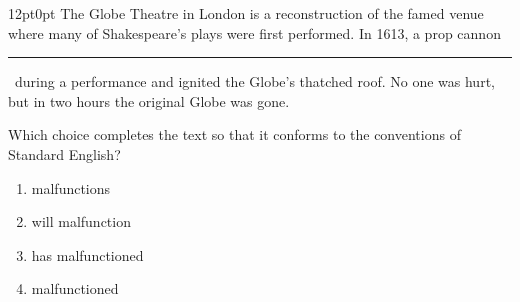 \documentclass[11pt, twocolumn]{article}
\newcounter{questionnum}
\begin{document}
\vspace{6pt}\noindent
\begin{minipage}{\columnwidth}\raggedright
\noindent{}\par\vspace{8pt}
\begin{adjustwidth}{12pt}{0pt}
The Globe Theatre in London is a reconstruction of the famed venue where many of Shakespeare's plays were first performed. In 1613, a prop cannon \,\rule{2cm}{0.4pt}\, during a performance and ignited the Globe's thatched roof. No one was hurt, but in two hours the original Globe was gone.
\vspace{6pt}

Which choice completes the text so that it conforms to the conventions of Standard English?
\begin{enumerate}[label=\Alph*),leftmargin=18pt,topsep=3pt,itemsep=2pt]
  \item malfunctions
  \item will malfunction
  \item has malfunctioned
  \item malfunctioned
\end{enumerate}
\end{adjustwidth}
\end{minipage}\par
\end{document}
